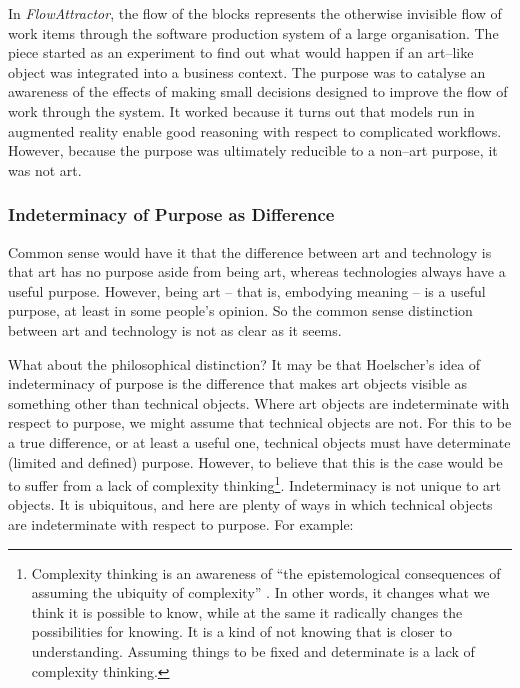 \documentclass[letterpaper]{article}
\begin{document}
    In \emph{FlowAttractor}, the flow of the blocks represents the otherwise invisible flow of work items through the software production system of a large organisation. The piece started as an experiment to find out what would happen if an art–like object was integrated into a business context. The purpose was to catalyse an awareness of the effects of making small decisions designed to improve the flow of work through the system. It worked because it turns out that models run in augmented reality enable good reasoning with respect to complicated workflows. However, because the purpose was ultimately reducible to a non–art purpose, it was not art.

    \subsubsection{Indeterminacy of Purpose as Difference}

    Common sense would have it that the difference between art and technology is that art has no purpose aside from being art, whereas technologies always have a useful purpose. However, being art – that is, embodying meaning – is a useful purpose, at least in some people's opinion. So the common sense distinction between art and technology is not as clear as it seems.

    What about the philosophical distinction? It may be that Hoelscher's idea of indeterminacy of purpose is the difference that makes art objects visible as something other than technical objects. Where art objects are indeterminate with respect to purpose, we might assume that technical objects are not. For this to be a true difference, or at least a useful one, technical objects must have determinate (limited and defined) purpose. However, to believe that this is the case would be to suffer from a lack of complexity thinking\footnote{

        Complexity thinking is an awareness of “the epistemological consequences of assuming the ubiquity of complexity” \citep{CilliersRichardsonCmplxtyScnc2001}. In other words, it changes what we think it is possible to know, while at the same it radically changes the possibilities for knowing. It is a kind of not knowing that is closer to understanding. Assuming things to be fixed and determinate is a lack of complexity thinking.
    
    }. Indeterminacy is not unique to art objects. It is ubiquitous, and here are plenty of ways in which technical objects are indeterminate with respect to purpose. For example:
\end{document}
